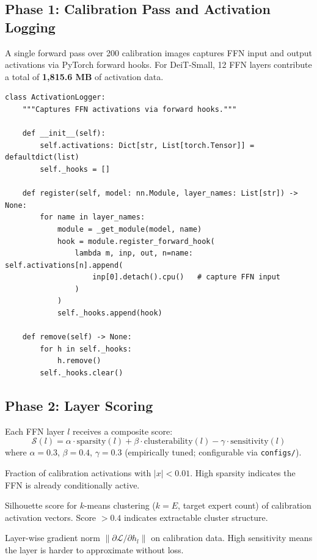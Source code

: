 \documentclass[12pt,a4paper]{article}
\begin{document}
\subsection{Phase 1: Calibration Pass and Activation Logging}

A single forward pass over 200 calibration images captures FFN input and output activations via PyTorch forward hooks. For DeiT-Small, 12 FFN layers contribute a total of \textbf{1,815.6 MB} of activation data.

\begin{lstlisting}[caption={Activation capture via forward hooks (excerpt from \texttt{clear\_moe/calibration.py}).},label={lst:hooks}]
class ActivationLogger:
    """Captures FFN activations via forward hooks."""

    def __init__(self):
        self.activations: Dict[str, List[torch.Tensor]] = defaultdict(list)
        self._hooks = []

    def register(self, model: nn.Module, layer_names: List[str]) -> None:
        for name in layer_names:
            module = _get_module(model, name)
            hook = module.register_forward_hook(
                lambda m, inp, out, n=name: self.activations[n].append(
                    inp[0].detach().cpu()   # capture FFN input
                )
            )
            self._hooks.append(hook)

    def remove(self) -> None:
        for h in self._hooks:
            h.remove()
        self._hooks.clear()
\end{lstlisting}

\subsection{Phase 2: Layer Scoring}

Each FFN layer $l$ receives a composite score:
\begin{equation}
\mathcal{S}(l) = \alpha \cdot \text{sparsity}(l) + \beta \cdot \text{clusterability}(l) - \gamma \cdot \text{sensitivity}(l)
\label{eq:score}
\end{equation}
where $\alpha = 0.3$, $\beta = 0.4$, $\gamma = 0.3$ (empirically tuned; configurable via \texttt{configs/}).

\begin{description}[leftmargin=1.5em]
\item[Sparsity:] Fraction of calibration activations with $|x| < 0.01$. High sparsity indicates the FFN is already conditionally active.
\item[Clusterability:] Silhouette score for $k$-means clustering ($k = E$, target expert count) of calibration activation vectors. Score $> 0.4$ indicates extractable cluster structure.
\item[Sensitivity:] Layer-wise gradient norm $\|\partial\mathcal{L}/\partial h_l\|$ on calibration data. High sensitivity means the layer is harder to approximate without loss.
\end{description}
\end{document}
